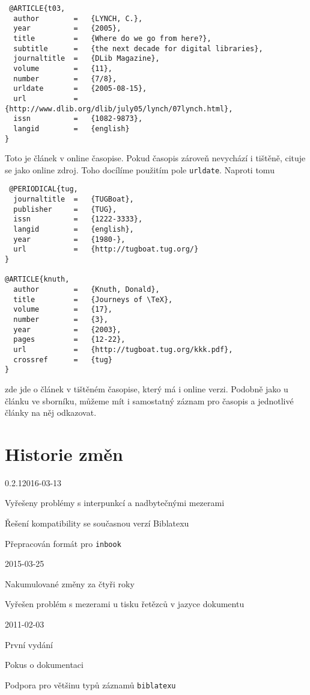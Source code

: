\documentclass[a4paper,10pt]{ltxdockit}
\def\t|#1|{\texttt{#1}}
\def\c#1{%
\hangpara{3em}{1}%
\fullcite{#1}}
\begin{document}
 \c{t03}
 \begin{verbatim}
 @ARTICLE{t03,
  author        =   {LYNCH, C.},
  year          =   {2005},
  title         =   {Where do we go from here?},
  subtitle      =   {the next decade for digital libraries},
  journaltitle  =   {DLib Magazine},
  volume        =   {11},
  number        =   {7/8},
  urldate       =   {2005-08-15},
  url           =   {http://www.dlib.org/dlib/july05/lynch/07lynch.html}, 
  issn          =   {1082-9873},
  langid        =   {english}
}
 \end{verbatim}
 
\noindent Toto je článek v online časopise. Pokud časopis zároveň nevychází i tištěně, cituje se jako online zdroj. Toho docílíme použitím pole \t|urldate|. Naproti tomu 
 
 \c{knuth}
 \begin{verbatim}
 @PERIODICAL{tug,
  journaltitle  =   {TUGBoat},
  publisher     =   {TUG},
  issn          =   {1222-3333},
  langid        =   {english},
  year          =   {1980-},
  url           =   {http://tugboat.tug.org/}
}

@ARTICLE{knuth,
  author        =   {Knuth, Donald},
  title         =   {Journeys of \TeX},
  volume        =   {17},
  number        =   {3},
  year          =   {2003},
  pages         =   {12-22},
  url           =   {http://tugboat.tug.org/kkk.pdf},
  crossref      =   {tug}
}
 \end{verbatim}
 
\noindent zde jde o článek v tištěném časopise, který má i online verzi. Podobně jako u článku ve sborníku, můžeme mít i samostatný záznam pro časopis a jednotlivé články na něj odkazovat.
\nocite{*}
\printbibliography[title={Ukázková bibliografie},heading={bibnumbered}]


\section{Historie změn}
\begin{changelog}
\begin{release}{0.2.1}{2016-03-13}
\item Vyřešeny problémy s interpunkcí a nadbytečnými mezerami
\item Řešení kompatibility se současnou verzí Biblatexu
\item Přepracován formát pro \verb|inbook|
\end{release}
\begin{release}{0.2}{2015-03-25}
\item Nakumulované změny za čtyři roky
\item Vyřešen problém s mezerami u tisku řetězců v jazyce dokumentu
\end{release}
\begin{release}{0.1}{2011-02-03}
\item První vydání
\item Pokus o dokumentaci
\item Podpora pro většinu typů záznamů \t|biblatexu|
\end{release}
\end{changelog}
\end{document}
